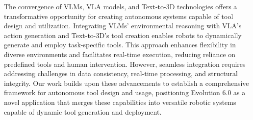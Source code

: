 The convergence of VLMs, VLA models, and Text-to-3D technologies offers a transformative opportunity for creating autonomous systems capable of tool design and utilization. Integrating VLMs' environmental reasoning with VLA's action generation and Text-to-3D's tool creation enables robots to dynamically generate and employ task-specific tools. This approach enhances flexibility in diverse environments and facilitates real-time execution, reducing reliance on predefined tools and human intervention. However, seamless integration requires addressing challenges in data consistency, real-time processing, and structural integrity. Our work builds upon these advancements to establish a comprehensive framework for autonomous tool design and usage, positioning Evolution 6.0 as a novel application that merges these capabilities into versatile robotic systems capable of dynamic tool generation and deployment.

